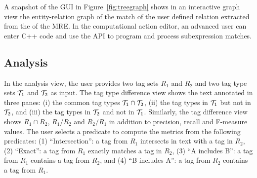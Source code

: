 A snapshot of the GUI in 
Figure~\ref{fig:treegraph} shows in an interactive graph view
the entity-relation graph of the match of the user defined relation 
extracted from the  of the MRE. 
%
In the computational action editor, an advanced user can 
enter C++ code and use the \framework API to program and process 
subexpression matches. 

\subsection{Analysis}

In the analysis view, the user provides 
two tag sets $R_1$ and $R_2$ and 
two tag type sets ${\cal T}_1$ and ${\cal T}_2$ as input. 
%
The tag type difference view shows the text annotated in three panes: 
(i) the common tag types ${\cal T}_1 \cap {\cal T}_2$,
(ii) the tag types in ${\cal T}_1$ but not in ${\cal T}_2$, 
and (iii) the tag types in ${\cal T}_2$ and not in ${\cal T}_1$.
%
Similarly, the tag difference view shows $R_1\cap R_2$, $R_1/R_2$ and $R_2/R_1$
in addition to precision, recall and F-measure values. 
The user selects a predicate to compute the metrics from the following predicates:
(1) ``Intersection'': a tag from $R_1$ intersects in text with a tag in $R_2$,
(2) ``Exact'': a tag from $R_1$ exactly matches a tag in $R_2$,
(3) ``A includes B'': a tag from $R_1$ contains a tag from $R_2$, and
(4) ``B includes A'': a tag from $R_2$ contains a tag from $R_1$.
